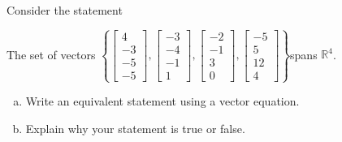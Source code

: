 
\begin{exerciseStatement}


Consider the statement 
\begin{center}\begin{minipage}{0.8\textwidth}
 The set of vectors \( \left\{ \left[\begin{array}{c}
4 \\
-3 \\
-5 \\
-5
\end{array}\right] , \left[\begin{array}{c}
-3 \\
-4 \\
-1 \\
1
\end{array}\right] , \left[\begin{array}{c}
-2 \\
-1 \\
3 \\
0
\end{array}\right] , \left[\begin{array}{c}
-5 \\
5 \\
12 \\
4
\end{array}\right] \right\} \)spans \(\mathbb{R}^4\). 
\end{minipage}\end{center}
    


\begin{enumerate}[(a)]
\item  Write an equivalent statement using a vector equation.
\item  Explain why your statement is true or false.
\end{enumerate}
    
\end{exerciseStatement}
    
